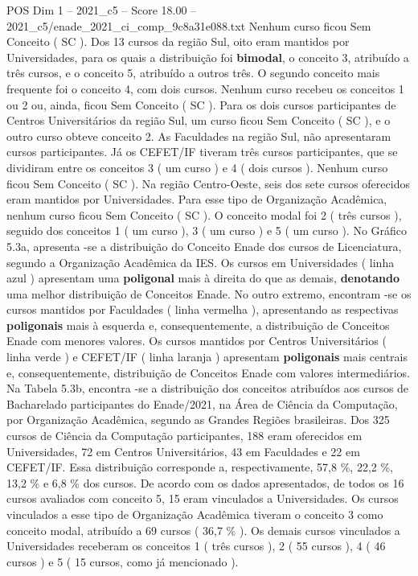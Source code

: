 \begin{textsample}{POS Dim 1 – 2021\_c5 – Score 18.00 – 2021\_c5/enade\_2021\_ci\_comp\_9c8a31e088.txt}
Nenhum curso ficou Sem Conceito ( SC ).
Dos 13 cursos da região Sul, oito eram mantidos por Universidades, para os quais a distribuição foi \textbf{bimodal}, o conceito 3, atribuído a três cursos, e o conceito 5, atribuído a outros três.
O segundo conceito mais frequente foi o conceito 4, com dois cursos.
Nenhum curso recebeu os conceitos 1 ou 2 ou, ainda, ficou Sem Conceito ( SC ).
Para os dois cursos participantes de Centros Universitários da região Sul, um curso ficou Sem Conceito ( SC ), e o outro curso obteve conceito 2.
As Faculdades na região Sul, não apresentaram cursos participantes.
Já os CEFET/IF tiveram três cursos participantes, que se dividiram entre os conceitos 3 ( um curso ) e 4 ( dois cursos ).
Nenhum curso ficou Sem Conceito ( SC ).
Na região Centro-Oeste, seis dos sete cursos oferecidos eram mantidos por Universidades.
Para esse tipo de Organização Acadêmica, nenhum curso ficou Sem Conceito ( SC ).
O conceito modal foi 2 ( três cursos ), seguido dos conceitos 1 ( um curso ), 3 ( um curso ) e 5 ( um curso ).
No Gráfico 5.3a, apresenta -se a distribuição do Conceito Enade dos cursos de Licenciatura, segundo a Organização Acadêmica da IES.
Os cursos em Universidades ( linha azul ) apresentam uma \textbf{poligonal} mais à direita do que as demais, \textbf{denotando} uma melhor distribuição de Conceitos Enade.
No outro extremo, encontram -se os cursos mantidos por Faculdades ( linha vermelha ), apresentando as respectivas \textbf{poligonais} mais à esquerda e, consequentemente, a distribuição de Conceitos Enade com menores valores.
Os cursos mantidos por Centros Universitários ( linha verde ) e CEFET/IF ( linha laranja ) apresentam \textbf{poligonais} mais centrais e, consequentemente, distribuição de Conceitos Enade com valores intermediários.
Na Tabela 5.3b, encontra -se a distribuição dos conceitos atribuídos aos cursos de Bacharelado participantes do Enade/2021, na Área de Ciência da Computação, por Organização Acadêmica, segundo as Grandes Regiões brasileiras.
Dos 325 cursos de Ciência da Computação participantes, 188 eram oferecidos em Universidades, 72 em Centros Universitários, 43 em Faculdades e 22 em CEFET/IF.
Essa distribuição corresponde a, respectivamente, 57,8 \%, 22,2 \%, 13,2 \% e 6,8 \% dos cursos.
De acordo com os dados apresentados, de todos os 16 cursos avaliados com conceito 5, 15 eram vinculados a Universidades.
Os cursos vinculados a esse tipo de Organização Acadêmica tiveram o conceito 3 como conceito modal, atribuído a 69 cursos ( 36,7 \% ).
Os demais cursos vinculados a Universidades receberam os conceitos 1 ( três cursos ), 2 ( 55 cursos ), 4 ( 46 cursos ) e 5 ( 15 cursos, como já mencionado ).

\end{textsample}
